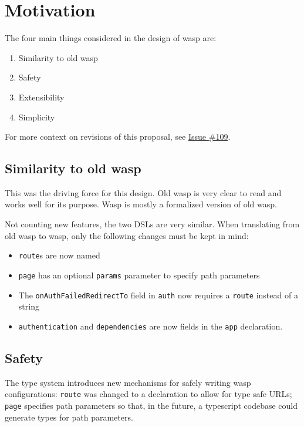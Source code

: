 \section{Motivation}

The four main things considered in the design of wasp are:

\begin{enumerate}
  \item Similarity to old wasp
  \item Safety
  \item Extensibility
  \item Simplicity
\end{enumerate}

For more context on revisions of this proposal, see
\href{https://github.com/wasp-lang/wasp/issues/109}{Issue \#109}.

\subsection{Similarity to old wasp}

This was the driving force for this design. Old wasp is very clear to read and
works well for its purpose. Wasp is mostly a formalized version of old wasp.

Not counting new features, the two DSLs are very similar. When translating
from old wasp to wasp, only the following changes must be kept in mind:

\begin{itemize}
  \item \texttt{route}s are now named
  \item \texttt{page} has an optional \texttt{params} parameter to specify
        path parameters
  \item The \texttt{onAuthFailedRedirectTo} field in \texttt{auth} now requires
        a \texttt{route} instead of a string
  \item \texttt{authentication} and \texttt{dependencies} are now fields in the
        \texttt{app} declaration.
\end{itemize}

\subsection{Safety}

The type system introduces new mechanisms for safely writing wasp
configurations: \texttt{route} was changed to a declaration to allow for
type safe URLs; \texttt{page} specifies path parameters so that, in the future,
a typescript codebase could generate types for path parameters.

